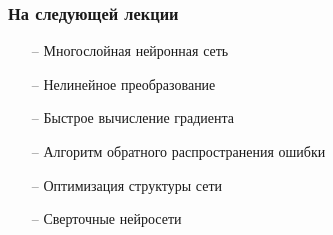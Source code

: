 \documentclass[10pt]{beamer}
\begin{document}
\begin{frame}\frametitle{На следующей лекции}
	\begin{itemize}
    	\item[--] Многослойная нейронная сеть
    	\item[--] Нелинейное преобразование
    	\item[--] Быстрое вычисление градиента
    	\item[--] Алгоритм обратного распространения ошибки
    	\item[--] Оптимизация структуры сети
    	\item[--] Сверточные нейросети   	    	
	\end{itemize}
\end{frame}
\end{document}
